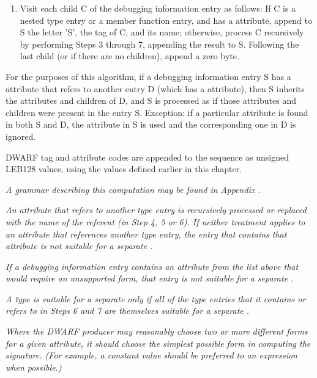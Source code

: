 \begin{enumerate}[1. ]
\item Visit each child C of the debugging information
entry as follows: If C is a nested type entry or a member
function entry, and has 
a \DWATname{} attribute, append to
S the letter 'S', the tag of C, and its name; otherwise,
process C recursively by performing Steps 3 through 7,
appending the result to S. Following the last child (or if
there are no children), append a zero byte.
\end{enumerate}



For the purposes of this algorithm, if a debugging information
entry S has a 
\DWATspecification{} 
attribute that refers to
another entry D (which has a 
\DWATdeclaration{} 
attribute),
then S inherits the attributes and children of D, and S is
processed as if those attributes and children were present in
the entry S. Exception: if a particular attribute is found in
both S and D, the attribute in S is used and the corresponding
one in D is ignored.

DWARF tag and attribute codes are appended to the sequence
as unsigned LEB128 values, 
using the values defined earlier in this chapter.

\textit{A grammar describing this computation may be found in
Appendix .
}

\textit{An attribute that refers to another type entry is
recursively processed or replaced with the name of the
referent (in Step 4, 5 or 6). If neither treatment applies to
an attribute that references another type entry, the entry
that contains that attribute is not suitable for a
separate .}

\textit{If a debugging information entry contains an attribute from
the list above that would require an unsupported form, that
entry is not suitable for a separate 
.}

\textit{A type is suitable for a separate 
 only
if all of the type entries that it contains or refers to in
Steps 6 and 7 are themselves suitable for a separate
.}

\textit{Where the DWARF producer may reasonably choose two or 
more different forms for a given attribute, it should choose
the simplest possible form in computing the signature. (For
example, a constant value should be preferred to
\bb
an
\eb
expression when possible.)}

